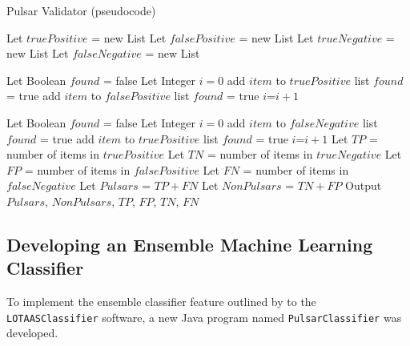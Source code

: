 \documentclass{article}
\begin{document}
\begin{algorithm}
    \caption{Pulsar Validator (pseudocode)}
    \label{alg:validator}
    \begin{algorithmic}
        \State Let $truePositive$ = new List
        \State Let $falsePositive$ = new List
        \State Let $trueNegative$ = new List
        \State Let $falseNegative$ = new List
        
            \State Let Boolean $found$ = false
            \State Let Integer $i=0$
                    \State add $item$ to $truePositive$ list
                    \State $found$ = true
                    \State add $item$ to $falsePositive$ list
                    \State $found$ = true
                \Else
                    \State $i$=$i+1$
                \EndIf
            \EndWhile
        \EndFor

            \State Let Boolean $found$ = false
            \State Let Integer $i=0$
                    \State add $item$ to $falseNegative$ list
                    \State $found$ = true
                    \State add $item$ to $truePositive$ list
                    \State $found$ = true
                \Else
                    \State $i$=$i+1$
                \EndIf
            \EndWhile
        \EndFor
        \State Let $TP$ = number of items in $truePositive$
        \State Let $TN$ = number of items in $trueNegative$
        \State Let $FP$ = number of items in $falsePositive$
        \State Let $FN$ = number of items in $falseNegative$
        \State Let $Pulsars$ = $TP+FN$
        \State Let $NonPulsars$ = $TN+FP$
        \State Output $Pulsars$, $NonPulsars$, $TP$, $FP$, $TN$, $FN$
    \end{algorithmic}
\end{algorithm}

\subsection{Developing an Ensemble Machine Learning Classifier}

To implement the ensemble classifier feature outlined by \textcite{tan} to the \verb|LOTAASClassifier| software, a new Java program named \verb|PulsarClassifier| was developed.
\end{document}
